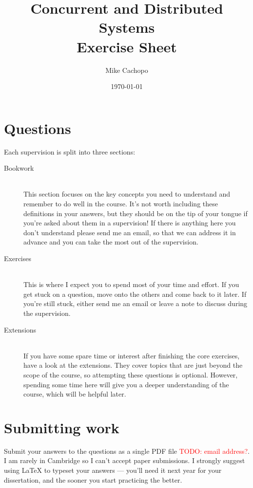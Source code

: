 \documentclass[12pt,a4paper,oneside,openright]{report}
\title{Concurrent and Distributed Systems\\ Exercise Sheet}
\date{\today}
\author{Mike Cachopo}
\newcommand{\todo}[1]{\textcolor{red}{TODO: #1}}
\begin{document}

\pagestyle{empty}

\maketitle

\newpage

\pagestyle{plain} 

\section*{Questions}

Each supervision is split into three sections:

\begin{description}
\item[Bookwork] \hfill\\
  This section focuses on the key concepts you need to understand and
  remember to do well in the course. It's not worth including these
  definitions in your answers, but they should be on the tip of your
  tongue if you're asked about them in a supervision! If there is
  anything here you don't understand please send me an email, so that
  we can address it in advance and you can take the most out of the
  supervision.
\item[Exercises] \hfill\\
  This is where I expect you to spend most of your time and effort. If
  you get stuck on a question, move onto the others and come back to
  it later. If you're still stuck, either send me an email or leave a
  note to discuss during the supervision.
\item[Extensions] \hfill\\
  If you have some spare time or interest after finishing the core
  exercises, have a look at the extensions. They cover topics that are
  just beyond the scope of the course, so attempting these questions
  is optional. However, spending some time here will give you a deeper
  understanding of the course, which will be helpful later.
\end{description}


\section*{Submitting work}

Submit your answers to the questions as a single PDF file \todo{email
  address?}. I am rarely in Cambridge so I can't accept paper
submissions. I strongly suggest using LaTeX to typeset your answers
--- you'll need it next year for your dissertation, and the sooner you
start practicing the better.
\end{document}
